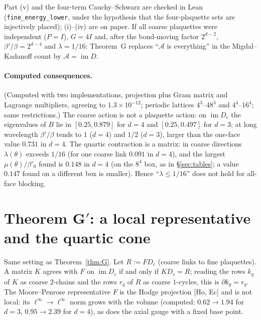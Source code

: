 \documentclass[11pt,a4paper]{article}
\theoremstyle{definition}
\theoremstyle{remark}
\newcommand{\cA}{\mathcal{A}}
\newcommand{\code}[1]{\texttt{#1}}
\newcommand{\im}{\operatorname{im}}
\begin{document}
Part (v) and the four-term Cauchy--Schwarz are checked in Lean (\code{fine\_energy\_lower}, under the hypothesis that the four-plaquette sets are injectively placed); (i)--(iv) are on paper.
If all coarse plaquettes were independent ($P=I$), $G=4I$ and, after the bond-moving factor $2^{d-2}$, $\beta'/\beta=2^{d-4}$ and $\lambda=1/16$: Theorem~G replaces ``$\cA$ is everything'' in the Migdal--Kadanoff count by $\cA=\im D$.

\paragraph{Computed consequences.}
(Computed with two implementations, projection plus Gram matrix and Lagrange multipliers, agreeing to $1.3\times10^{-12}$; periodic lattices $4^3$--$48^3$ and $4^4$--$16^4$; same restrictions.)
The coarse action is not a plaquette action: on $\im D_c$ the eigenvalues of $B$ lie in $[0.25,0.879]$ for $d=4$ and $[0.25,0.497]$ for $d=3$; at long wavelength $\beta'/\beta$ tends to $1$ ($d=4$) and $1/2$ ($d=3$), larger than the one-face value $0.731$ in $d=4$.
The quartic contraction is a matrix: in coarse directions $\lambda(\theta)$ exceeds $1/16$ (for one coarse link $0.091$ in $d=4$), and the largest $\mu(\theta)/\beta'_0$ found is $0.148$ in $d=4$ (on the $8^4$ box, as in \S\ref{sec:tables}; a value $0.147$ found on a different box is smaller). Hence ``$\lambda\le1/16$'' does not hold for all-face blocking.

\section{Theorem G$'$: a local representative and the quartic cone}\label{sec:Gprime}

Same setting as Theorem~\ref{thm:G}. Let $R:=FD_c$ (coarse links to fine plaquettes). A matrix $K$ agrees with $F$ on $\im D_c$ if and only if $KD_c=R$; reading the rows $k_q$ of $K$ as coarse $2$-chains and the rows $r_q$ of $R$ as coarse $1$-cycles, this is $\partial k_q=r_q$. The Moore--Penrose representative $F$ is the Hodge projection [Ho, Ec] and is not local: its $\ell^\infty\to\ell^\infty$ norm grows with the volume (computed: $0.62\to1.94$ for $d=3$, $0.95\to2.39$ for $d=4$), as does the axial gauge with a fixed base point.
\end{document}
